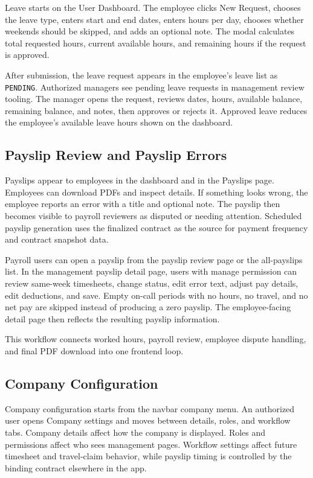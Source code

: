 \documentclass[11pt]{article}
\newcommand{\code}[1]{\nolinkurl{#1}}
\begin{document}
Leave starts on the User Dashboard. The employee clicks New Request, chooses the leave type, enters start and end dates, enters hours per day, chooses whether weekends should be skipped, and adds an optional note. The modal calculates total requested hours, current available hours, and remaining hours if the request is approved.

After submission, the leave request appears in the employee's leave list as \code{PENDING}. Authorized managers see pending leave requests in management review tooling. The manager opens the request, reviews dates, hours, available balance, remaining balance, and notes, then approves or rejects it. Approved leave reduces the employee's available leave hours shown on the dashboard.

\subsection{Payslip Review and Payslip Errors}

Payslips appear to employees in the dashboard and in the Payslips page. Employees can download PDFs and inspect details. If something looks wrong, the employee reports an error with a title and optional note. The payslip then becomes visible to payroll reviewers as disputed or needing attention. Scheduled payslip generation uses the finalized contract as the source for payment frequency and contract snapshot data.

Payroll users can open a payslip from the payslip review page or the all-payslips list. In the management payslip detail page, users with manage permission can review same-week timesheets, change status, edit error text, adjust pay details, edit deductions, and save. Empty on-call periods with no hours, no travel, and no net pay are skipped instead of producing a zero payslip. The employee-facing detail page then reflects the resulting payslip information.

This workflow connects worked hours, payroll review, employee dispute handling, and final PDF download into one frontend loop.

\subsection{Company Configuration}

Company configuration starts from the navbar company menu. An authorized user opens Company settings and moves between details, roles, and workflow tabs. Company details affect how the company is displayed. Roles and permissions affect who sees management pages. Workflow settings affect future timesheet and travel-claim behavior, while payslip timing is controlled by the binding contract elsewhere in the app.
\end{document}
